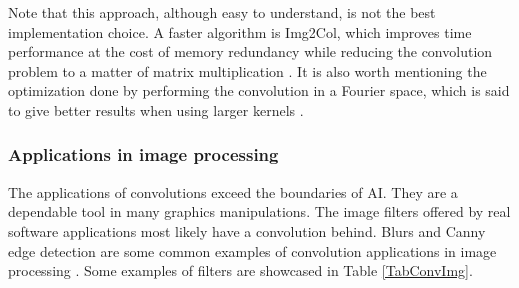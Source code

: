 Note that this approach, although easy to understand, is not the best implementation choice. A faster algorithm is Img2Col, which improves time performance at the cost of memory redundancy while reducing the convolution problem to a matter of matrix multiplication \cite{img2col}. It is also worth mentioning the optimization done by performing the convolution in a Fourier space, which is said to give better results when using larger kernels \cite{fourierconv}.

\subsubsection{Applications in image processing}
\label{subsubsec:ch3sec3subsec3subsubsec1}

The applications of convolutions exceed the boundaries of AI. They are a dependable tool in many graphics manipulations. The image filters offered by real software applications most likely have a convolution behind. Blurs and Canny edge detection \cite{canny} are some common examples of convolution applications in image processing \cite{imgproc}. Some examples of filters are showcased in Table \ref{TabConvImg}. 

\newcommand\cincludegraphics[2][]{\raisebox{-0.3\height}{\texttt{[image: \#2]}}}

